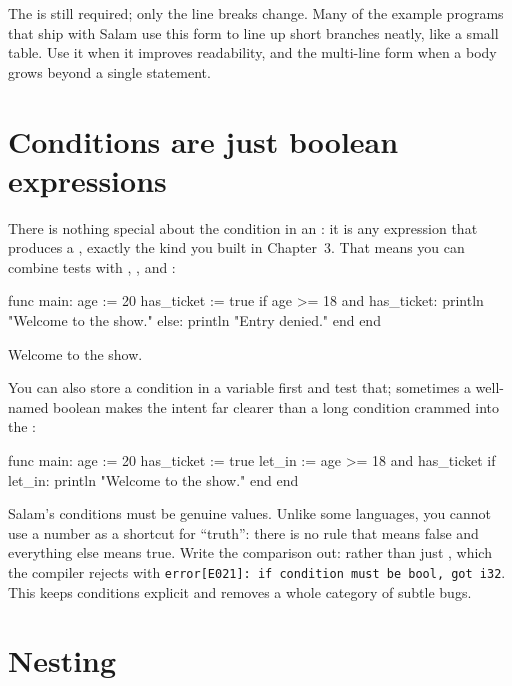 The  is still required; only the line breaks change. Many of the
example programs that ship with Salam use this form to line up short branches
neatly, like a small table. Use it when it improves readability, and the
multi-line form when a body grows beyond a single statement.

\section{Conditions are just boolean expressions}

There is nothing special about the condition in an : it is any
expression that produces a , exactly the kind you built in Chapter~3.
That means you can combine tests with , , and :

\begin{salamen}
func main:
    age := 20
    has_ticket := true
    if age >= 18 and has_ticket:
        println "Welcome to the show."
    else:
        println "Entry denied."
    end
end
\end{salamen}

\begin{progout}
Welcome to the show.
\end{progout}

You can also store a condition in a  variable first and test that;
sometimes a well-named boolean makes the intent far clearer than a long condition
crammed into the :

\begin{salamen}
func main:
    age := 20
    has_ticket := true
    let_in := age >= 18 and has_ticket
    if let_in:
        println "Welcome to the show."
    end
end
\end{salamen}

\begin{warn}
Salam's conditions must be genuine  values. Unlike some languages, you
cannot use a number as a shortcut for ``truth'': there is no rule that
 means false and everything else means true. Write the comparison out:
 rather than just , which the compiler rejects
with \texttt{error[E021]: if condition must be bool, got \textquotesingle{}i32\textquotesingle{}}. This keeps conditions explicit
and removes a whole category of subtle bugs.
\end{warn}

\section{Nesting}

